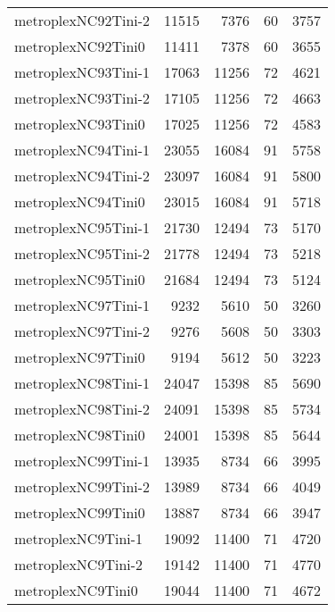 \begin{tabular}{lrrrr}
metroplexNC92Tini-2 & 11515 & 7376 & 60 & 3757 \\
metroplexNC92Tini0 & 11411 & 7378 & 60 & 3655 \\
metroplexNC93Tini-1 & 17063 & 11256 & 72 & 4621 \\
metroplexNC93Tini-2 & 17105 & 11256 & 72 & 4663 \\
metroplexNC93Tini0 & 17025 & 11256 & 72 & 4583 \\
metroplexNC94Tini-1 & 23055 & 16084 & 91 & 5758 \\
metroplexNC94Tini-2 & 23097 & 16084 & 91 & 5800 \\
metroplexNC94Tini0 & 23015 & 16084 & 91 & 5718 \\
metroplexNC95Tini-1 & 21730 & 12494 & 73 & 5170 \\
metroplexNC95Tini-2 & 21778 & 12494 & 73 & 5218 \\
metroplexNC95Tini0 & 21684 & 12494 & 73 & 5124 \\
metroplexNC97Tini-1 & 9232 & 5610 & 50 & 3260 \\
metroplexNC97Tini-2 & 9276 & 5608 & 50 & 3303 \\
metroplexNC97Tini0 & 9194 & 5612 & 50 & 3223 \\
metroplexNC98Tini-1 & 24047 & 15398 & 85 & 5690 \\
metroplexNC98Tini-2 & 24091 & 15398 & 85 & 5734 \\
metroplexNC98Tini0 & 24001 & 15398 & 85 & 5644 \\
metroplexNC99Tini-1 & 13935 & 8734 & 66 & 3995 \\
metroplexNC99Tini-2 & 13989 & 8734 & 66 & 4049 \\
metroplexNC99Tini0 & 13887 & 8734 & 66 & 3947 \\
metroplexNC9Tini-1 & 19092 & 11400 & 71 & 4720 \\
metroplexNC9Tini-2 & 19142 & 11400 & 71 & 4770 \\
metroplexNC9Tini0 & 19044 & 11400 & 71 & 4672 \\
\bottomrule
\end{tabular}
